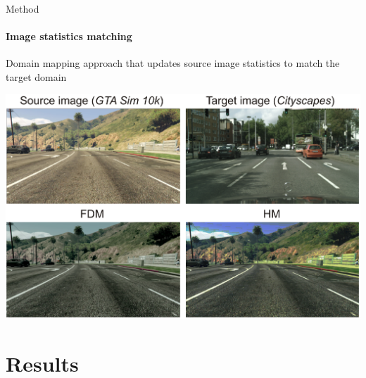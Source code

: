 \documentclass[aspectratio=141]{beamer}
\begin{document}
\begin{frame}{Method}
    \framesubtitle{Image statistics matching}
    \begin{itemize}
        \item Domain mapping approach that updates source image statistics to match the target domain
        \vspace*{-4mm}
        \begin{center}
            \item[]
            \hspace{-.08\textwidth}
            \includegraphics[width=.65\textwidth]{imgs/image26.png}
        \end{center}
    \end{itemize}
\end{frame}

\section{Results}
\end{document}
